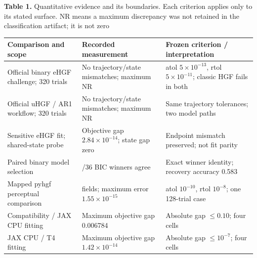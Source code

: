 \documentclass[
  11pt,
]{article}
\newcounter{none} %
\begin{document}
\begin{minipage}{\linewidth}
\textbf{Table 1.} Quantitative evidence and its boundaries. Each
criterion applies only to its stated surface. NR means a maximum
discrepancy was not retained in the classification artifact; it is not
zero

{\def\LTcaptype{none} %
\begin{tabular}{@{}
  >{\raggedright\arraybackslash}p{}
  >{\raggedright\arraybackslash}p{}
  >{\raggedright\arraybackslash}p{}@{}}
\toprule\noalign{}
\begin{minipage}[b]{\linewidth}\raggedright
Comparison and scope
\end{minipage} & \begin{minipage}[b]{\linewidth}\raggedright
Recorded measurement
\end{minipage} & \begin{minipage}[b]{\linewidth}\raggedright
Frozen criterion / interpretation
\end{minipage} \\
\midrule\noalign{}


Official binary eHGF challenge; 320 trials & No trajectory/state
mismatches; maximum NR & atol \(5\times10^{-13}\), rtol
\(5\times10^{-11}\); classic HGF fails in both \\
Official uHGF / AR1 workflow; 320 trials & No trajectory/state
mismatches; maximum NR & Same trajectory tolerances; two model paths \\
Sensitive eHGF fit; shared-state probe & Objective gap
\(2.84\times10^{-14}\); state gap zero & Endpoint mismatch preserved;
not fit parity \\
Paired binary model selection & 36/36 BIC winners agree & Exact winner
identity; recovery accuracy 0.583 \\
Mapped pyhgf perceptual comparison & 11 fields; maximum error
\(1.55\times10^{-15}\) & atol \(10^{-10}\), rtol \(10^{-8}\); one
128-trial case \\
Compatibility / JAX CPU fitting & Maximum objective gap 0.006784 &
Absolute gap \(\leq0.10\); four cells \\
JAX CPU / T4 fitting & Maximum objective gap \(1.42\times10^{-14}\) &
Absolute gap \(\leq10^{-7}\); four cells \\
\bottomrule
\end{tabular}
}
\end{minipage}
\end{document}
